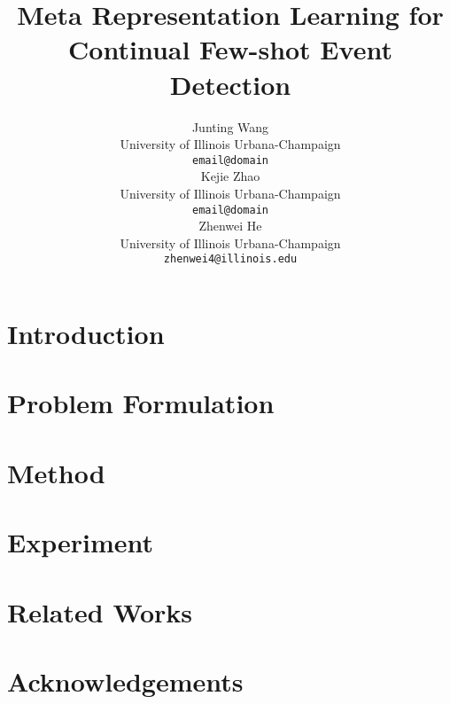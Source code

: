 \documentclass[11pt]{article}
\title{Meta Representation Learning for Continual Few-shot Event Detection}
\author{Junting Wang \\
  University of Illinois Urbana-Champaign \\
  \texttt{email@domain} \\\And
  Kejie Zhao \\
  University of Illinois Urbana-Champaign \\
  \texttt{email@domain} \\\And
  Zhenwei He \\
  University of Illinois Urbana-Champaign \\
  \texttt{zhenwei4@illinois.edu} \\}
\begin{document}
\maketitle\begin{abstract}

\end{abstract}


\section{Introduction}
\label{sec:introduction}



\section{Problem Formulation}
\label{sec:formulation}


\section{Method}
\label{sec:method}



\section{Experiment }
\label{sec:experiment}


\section{Related Works}
\label{sec:related_work}




%
%
%



\section{Acknowledgements}


\nocite{Ando2005,borschinger-johnson-2011-particle,andrew2007scalable,rasooli-tetrault-2015,goodman-etal-2016-noise,harper-2014-learning}


\appendix
\end{document}
